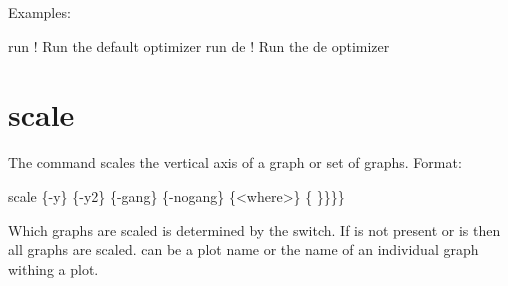 Examples:
\begin{example}
  run         ! Run the default optimizer
  run de      ! Run the de optimizer
\end{example}

\section{scale}
\label{s:scale}

The  command scales the vertical axis of a graph or set of graphs.  Format:
\begin{example}
  scale \{-y\} \{-y2\} \{-gang\} \{-nogang\} \{<where>\} \{<value1> \}<value2>\}\}\}
\end{example}

Which graphs are scaled is determined by the  switch. If  is not
present or  is  then all graphs are scaled.  can be a plot
name or the name of an individual graph withing a plot.

\vskip 10pt 

